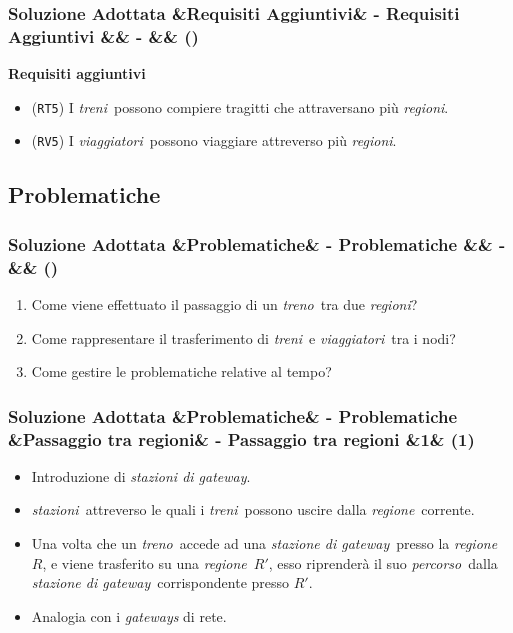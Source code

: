 \documentclass[slidestop,compress,blackandwhite]{beamer}
\newcommand{\ttt}[1]{\texttt{#1}}
\newcommand{\ii}[1]{\textit{#1}}
\newcommand{\treno}{\ii{treno}}
\newcommand{\treni}{\ii{treni}}
\newcommand{\viaggiatori}{\ii{viaggiatori}}
\newcommand{\stazioni}{\ii{stazioni}}
\newcommand{\route}{\ii{percorso}}
\newcommand{\regione}{\ii{regione}}
\newcommand{\regioni}{\ii{regioni}}
\newcommand{\gateway}{\ii{stazione di gateway}}
\newcommand{\gateways}{\ii{stazioni di gateway}}
\newcommand{\cm}[1]{\vspace{#1cm}}
\newcommand{\newtitle}[4]{
	#1 
	\ifx&#2&%
	\else
  		\large- #2
	\fi
	\ifx&#3&%
	\else
  		\normalsize- #3
	\fi
	\ifx&#4&%
	\else
  		\normalsize (#4)
	\fi
}
\newcommand{\newframe}[5]{
	\begin{frame}
		\frametitle{\newtitle{#1}{#2}{#3}{#4}}
		#5
	\end{frame}
}
\newcommand{\itemt}[1]{\item (\ttt{#1})}
\newcommand{\myitemize}[1]{\begin{itemize}#1\end{itemize}}
\begin{document}
	\newframe{Soluzione Adottata}{Requisiti Aggiuntivi}{}{}{
		\cm{0.5}
		\textbf{Requisiti aggiuntivi}
		\cm{0.5}
		\begin{itemize}
			\itemt{RT5} I \treni~possono compiere tragitti che attraversano più \regioni.
			\cm{0.5}	
			\itemt{RV5} I \viaggiatori~possono viaggiare attreverso più \regioni.
		\end{itemize}
	}
	
	\subsection{Problematiche}
	\newframe{Soluzione Adottata}{Problematiche}{}{}{
		\vspace{0.5cm}
		\begin{enumerate}
			\item Come viene effettuato il passaggio di un \treno~tra due \regioni? 
			\vspace{0.4cm}
			\item Come rappresentare il trasferimento di \treni~e \viaggiatori~tra i nodi? 
			\vspace{0.4cm}
			\item Come gestire le problematiche relative al tempo?
		\end{enumerate}
	}
	
	\newframe{Soluzione Adottata}{Problematiche}{Passaggio tra regioni}{1}{
		\vspace{0.5cm}
		\myitemize{
			\item Introduzione di \gateways.
			\vspace{0.3cm}
			\item \stazioni~attreverso le quali i \treni~possono uscire dalla \regione~corrente.
			\vspace{0.3cm}
			\item Una volta che un \treno~accede ad una \gateway~presso la \regione~$R$, e viene trasferito su una \regione~$R'$, esso riprenderà il suo \route~dalla \gateway~corrispondente presso $R'$. 
			\item Analogia con i \ii{gateways} di rete.
		}
	}
	
\end{document}
